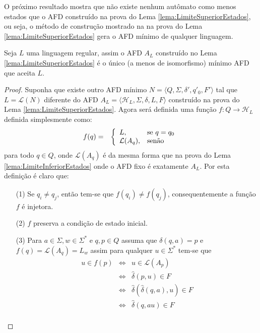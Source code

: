 O próximo resultado mostra que não existe nenhum autômato como menos estados que o AFD construído na prova do Lema \ref{lema:LimiteSuperiorEstados}, ou seja, o método de construção mostrado na  na prova do Lema \ref{lema:LimiteSuperiorEstados} gera o AFD mínimo de qualquer linguagem.

\begin{lemma}\label{lema:UnicadadeMinAFD}
	Seja $L$ uma linguagem regular, assim o  AFD $A_L$ construído no Lema \ref{lema:LimiteSuperiorEstados} é o único (a menos de isomorfismo) mínimo AFD que aceita $L$.
\end{lemma}

\begin{proof}
	Suponha que existe outro AFD mínimo $N = \langle Q, \Sigma, \delta', q'_0, F' \rangle$ tal que $L = \mathcal{L}(N)$ diferente do AFD $A_L = \langle \mathcal{H}_L, \Sigma, \delta, L, F \rangle$ construído na prova do Lema \ref{lema:LimiteSuperiorEstados}. Agora será definida uma função $f: Q \rightarrow \mathcal{H}_L$ definida simplesmente como: 
	\begin{eqnarray*}
		f(q) & = & \left\{\begin{array}{ll}	L, & \hbox{se } q = q_0\\	\mathcal{L}(A_q),  & \hbox{senão}\end{array}\right.
	\end{eqnarray*}
	para todo $q \in Q$, onde $\mathcal{L}(A_q)$ é da mesma forma que na prova do Lema \ref{lema:LimiteInferiorEstados} onde o AFD fixo é exatamente $A_L$. Por esta definição é claro que: 
	\begin{itemize}
		\item[(1)] Se $q_i \neq q_j$, então tem-se que $f(q_i) \neq f(q_j)$, consequentemente a função $f$ é injetora.
		\item[(2)] $f$ preserva a condição de estado inicial.
		\item[(3)] Para $a \in \Sigma, w \in \Sigma^*$ e $q, p \in Q$ assuma que $\delta(q, a) = p$ e $f(q) = \mathcal{L}(A_q) = L_w$ assim para qualquer $u \in \Sigma^*$ tem-se que
		\begin{eqnarray*}
			u \in f(p) & \Longleftrightarrow & u \in \mathcal{L}(A_p)\\
			& \Longleftrightarrow &  \widehat{\delta}(p, u) \in F\\
			& \Longleftrightarrow &  \widehat{\delta}(\widehat{\delta}(q, a), u) \in F\\
			& \Longleftrightarrow &  \widehat{\delta}(q, au) \in F\\

\end{eqnarray*}
\end{itemize}
\end{proof}
